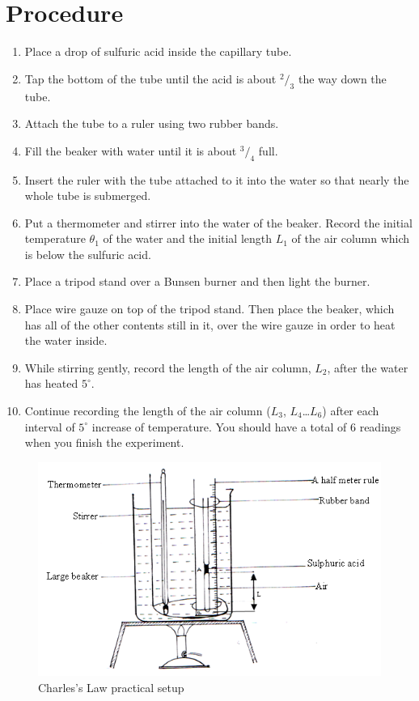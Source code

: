 \section{Procedure}
\begin{enumerate}
\item Place a drop of sulfuric acid inside the capillary tube.
\item Tap the bottom of the tube until the acid is about $^2/_3$ the way down the tube.
\item Attach the tube to a ruler using two rubber bands.
\item Fill the beaker with water until it is about $^3/_4$ full.
\item Insert the ruler with the tube attached to it into the water so that nearly the whole tube is submerged. 
\item Put a thermometer and stirrer into the water of the beaker. Record the initial temperature $\theta_1$ of the water and the initial length $L_1$ of the air column which is below the sulfuric acid. 
\item Place a tripod stand over a Bunsen burner and then light the burner. 
\item Place wire gauze on top of the tripod stand. Then place the beaker, which has all of the other contents still in it, over the wire gauze in order to heat the water inside.
\item While stirring gently, record the length of the air column, $L_2$, after the water has heated $5^\circ$. 
\item Continue recording the length of the air column ($L_3$, $L_4$\ldots $L_6$) after each interval of $5^\circ$ increase of temperature. You should have a total of 6 readings when you finish the experiment.
\end{enumerate}

\begin{figure}[h!]
\centering
\includegraphics[width=12cm]{./img/charles-law-1.png}
\caption{Charles's Law practical setup}
\label{fig:charles-law-1}
\end{figure}

